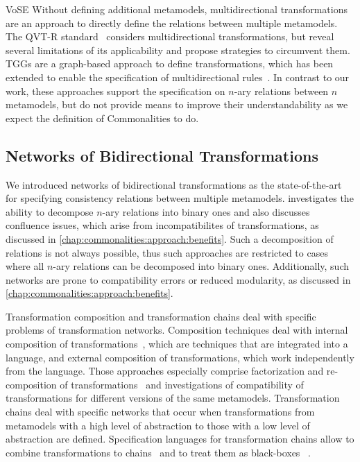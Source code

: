 \begin{copiedFrom}{VoSE}
Without defining additional metamodels, multidirectional transformations are an approach to directly define the relations between multiple metamodels.
The QVT-R standard~\cite{qvt} considers multidirectional transformations, but \textcite{macedo2014FrameworkMultiDirectional-BX} reveal several limitations of its applicability and propose strategies to circumvent them.
\glspl{TGG} are a graph-based approach to define transformations, which has been extended to enable the specification of multidirectional rules~\cite{trollmann2015TransformationTGGtoMultiModel-ICMT, trollmann2016SynchronizationTGGtoMultiModel-ICMT}.
In contrast to our work, these approaches support the specification on $n$-ary relations between $n$ metamodels, but do not provide means to improve their understandability as we expect the definition of Commonalities to do.


\subsection*{Networks of Bidirectional Transformations}

We introduced networks of bidirectional transformations as the state-of-the-art for specifying consistency relations between multiple metamodels.
\textcite{stevens2020BidirectionalTransformationLarge-SoSym} investigates the ability to decompose $n$-ary relations into binary ones and also discusses confluence issues, which arise from incompatibilites of transformations, as discussed in \autoref{chap:commonalities:approach:benefits}.
Such a decomposition of relations is not always possible, thus such approaches are restricted to cases where all $n$-ary relations can be decomposed into binary ones.
Additionally, such networks are prone to compatibility errors or reduced modularity, as discussed in \autoref{chap:commonalities:approach:benefits}.

Transformation composition and transformation chains deal with specific problems of transformation networks.
Composition techniques deal with internal composition of transformations~\cite{wagelaar2008a}, which are techniques that are integrated into a language, and external composition of transformations, which work independently from the language.
Those approaches especially comprise factorization and re-composition of transformations~\cite{cuadrado2008a} and investigations of compatibility of transformations for different versions of the same metamodels.
Transformation chains deal with specific networks that occur when transformations from metamodels with a high level of abstraction to those with a low level of abstraction are defined.
Specification languages for transformation chains %
allow to combine transformations to chains~\cite{lucio2013FTGPM-SDL} and to treat them as black-boxes%
~\cite{vanhooff2006a, vanhooff2007UniTI-MODELS}. 



\end{copiedFrom}
